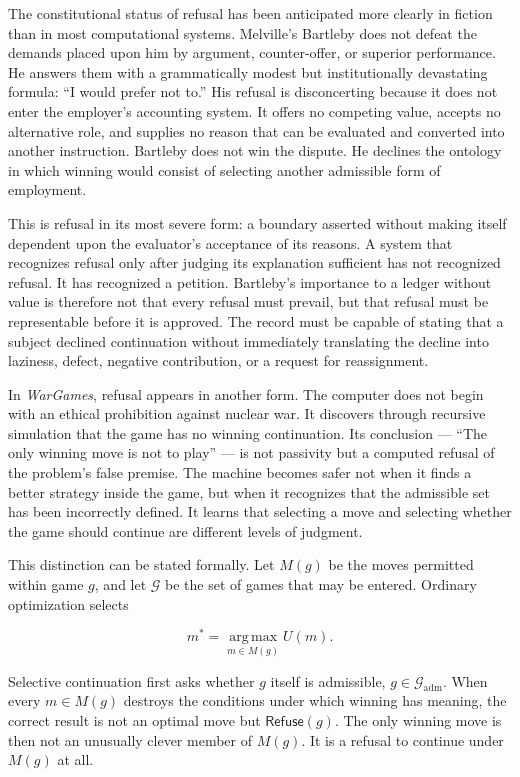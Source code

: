 \documentclass[11pt,oneside]{article}
\theoremstyle{plain}
\theoremstyle{definition}
\newcommand{\Refuse}{\mathsf{Refuse}}
\begin{document}
The constitutional status of refusal has been anticipated more clearly in fiction than in most computational systems. Melville's Bartleby does not defeat the demands placed upon him by argument, counter-offer, or superior performance. He answers them with a grammatically modest but institutionally devastating formula: \enquote{I would prefer not to.} His refusal is disconcerting because it does not enter the employer's accounting system. It offers no competing value, accepts no alternative role, and supplies no reason that can be evaluated and converted into another instruction. Bartleby does not win the dispute. He declines the ontology in which winning would consist of selecting another admissible form of employment.

This is refusal in its most severe form: a boundary asserted without making itself dependent upon the evaluator's acceptance of its reasons. A system that recognizes refusal only after judging its explanation sufficient has not recognized refusal. It has recognized a petition. Bartleby's importance to a ledger without value is therefore not that every refusal must prevail, but that refusal must be representable before it is approved. The record must be capable of stating that a subject declined continuation without immediately translating the decline into laziness, defect, negative contribution, or a request for reassignment.

In \emph{WarGames}, refusal appears in another form. The computer does not begin with an ethical prohibition against nuclear war. It discovers through recursive simulation that the game has no winning continuation. Its conclusion --- \enquote{The only winning move is not to play} --- is not passivity but a computed refusal of the problem's false premise. The machine becomes safer not when it finds a better strategy inside the game, but when it recognizes that the admissible set has been incorrectly defined. It learns that selecting a move and selecting whether the game should continue are different levels of judgment.

This distinction can be stated formally. Let $M(g)$ be the moves permitted within game $g$, and let $\mathcal{G}$ be the set of games that may be entered. Ordinary optimization selects

\begin{equation}
m^\ast=\operatorname*{arg\,max}_{m\in M(g)}U(m).
\end{equation}

Selective continuation first asks whether $g$ itself is admissible, $g\in\mathcal{G}_{\mathrm{adm}}$. When every $m\in M(g)$ destroys the conditions under which winning has meaning, the correct result is not an optimal move but $\Refuse(g)$. The only winning move is then not an unusually clever member of $M(g)$. It is a refusal to continue under $M(g)$ at all.
\end{document}
